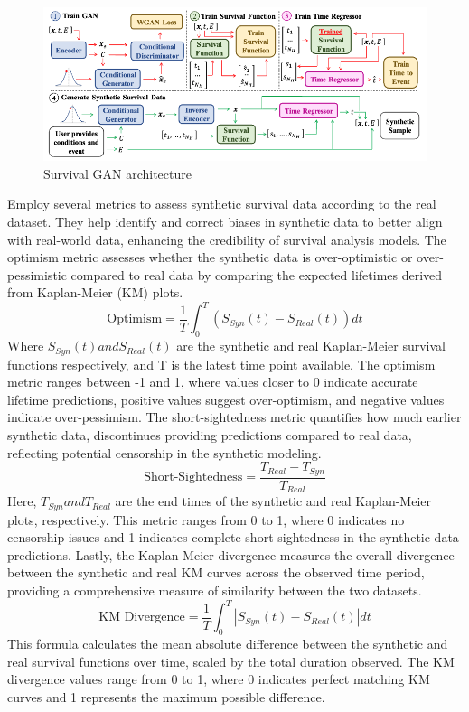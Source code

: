 \begin{figure}
	\includegraphics[scale=0.51]{Figures/GAN_ARCH.png}
	\caption{\parencite{norcliffe_survivalgan_2023} Survival GAN architecture}
\end{figure}

\noindent \parencite{norcliffe_survivalgan_2023} Employ several metrics to assess synthetic survival data according to the real dataset. They help identify and correct biases in synthetic data to better align with real-world data, enhancing the credibility of survival analysis models. The optimism metric assesses whether the synthetic data is over-optimistic or over-pessimistic compared to real data by comparing the expected lifetimes derived from Kaplan-Meier (KM) plots.
\begin{equation} \label{eq:optimisim}\text{Optimism} = \frac{1}{T} \int_{0}^{T}(S_{Syn}(t)-S_{Real}(t))dt\end{equation}
\noindent Where \(S_{Syn}(t) and S_{Real}(t)\) are the synthetic and real Kaplan-Meier survival functions respectively, and T is the latest time point available. The optimism metric ranges between -1 and 1, where values closer to 0 indicate accurate lifetime predictions, positive values suggest over-optimism, and negative values indicate over-pessimism. The short-sightedness metric quantifies how much earlier synthetic data, discontinues providing predictions compared to real data, reflecting potential censorship in the synthetic modeling.
\begin{equation} \label{eq:ssmetric}\text{Short-Sightedness} = \frac{T_{Real}-T_{Syn}}{T_{Real}}\end{equation}
\noindent Here, \(T_{Syn} and T_{Real}\) are the end times of the synthetic and real Kaplan-Meier plots, respectively. This metric ranges from 0 to 1, where 0 indicates no censorship issues and 1 indicates complete short-sightedness in the synthetic data predictions. Lastly, the Kaplan-Meier divergence measures the overall divergence between the synthetic and real KM curves across the observed time period, providing a comprehensive measure of similarity between the two datasets.
\begin{equation} \label{eq:kmdiverge}\text{KM Divergence} = \frac{1}{T}\int_{0}^{T}|S_{Syn}(t)-S_{Real}(t)|dt\end{equation}
\noindent This formula calculates the mean absolute difference between the synthetic and real survival functions over time, scaled by the total duration observed. The KM divergence values range from 0 to 1, where 0 indicates perfect matching KM curves and 1 represents the maximum possible difference.

